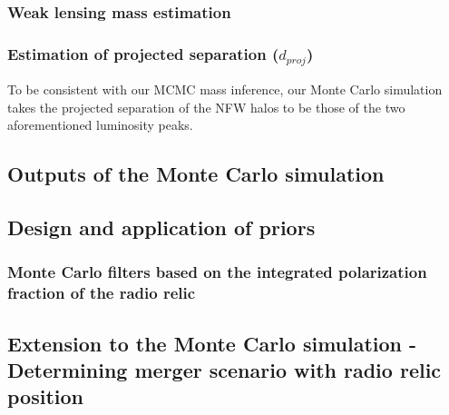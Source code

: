 \documentclass[letterpaper,useAMS,usenatbib]{"mn2e"}
\begin{document}
\subsubsection{Weak lensing mass estimation} 



\subsubsection{Estimation of projected separation ($d_{proj}$) } 
To be consistent with our MCMC mass inference, our Monte Carlo simulation takes 
the projected separation of the NFW halos to be those of the two aforementioned 
luminosity peaks.

\subsection{Outputs of the Monte Carlo simulation}
\label{sec: outputs}


\subsection{Design and application of priors} 
\label{sec:priors}


\subsubsection{Monte Carlo filters based on the integrated polarization fraction of the radio relic}


\subsection{Extension to the Monte Carlo simulation - Determining merger scenario with radio relic position}
\label{sec: positionprior}

\end{document}
